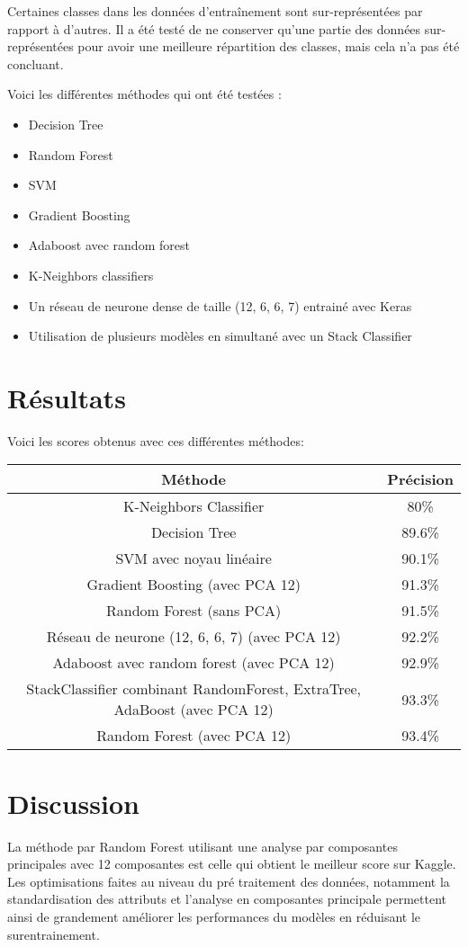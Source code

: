 \documentclass[12pt]{article}
\begin{document}
Certaines classes dans les données d'entraînement sont sur-représentées par rapport à d'autres. Il a été testé de ne conserver qu'une partie des données sur-représentées pour avoir une meilleure répartition des classes, mais cela n'a pas été concluant. 

\newpage
Voici les différentes méthodes qui ont été testées :

\begin{itemize}
	\item Decision Tree
	\item Random Forest
	\item SVM
	\item Gradient Boosting
	\item Adaboost avec random forest
	\item K-Neighbors classifiers
	\item Un réseau de neurone dense de taille (12, 6, 6, 7) entrainé avec Keras
	\item Utilisation de plusieurs modèles en simultané avec un Stack Classifier
	
\end{itemize}


\section*{Résultats}

Voici les scores obtenus avec ces différentes méthodes:
\begin{center}
	\begin{tabular}{ |c|c| }
		\hline
		Méthode & Précision \\\hline\hline
	  K-Neighbors Classifier & 80\% \\\hline
		Decision Tree & 89.6\% \\\hline
		SVM avec noyau linéaire & 90.1\% \\\hline
		Gradient Boosting (avec PCA 12) & 91.3\% \\\hline
		Random Forest (sans PCA) & 91.5\% \\\hline
		Réseau de neurone (12, 6, 6, 7) (avec PCA 12) & 92.2\% \\\hline
		Adaboost avec random forest (avec PCA 12) & 92.9\% \\\hline
		StackClassifier combinant RandomForest, ExtraTree, AdaBoost (avec PCA 12) & 93.3\% \\\hline
		Random Forest (avec PCA 12) & 93.4\% \\\hline

	\end{tabular} 
\end{center}


\section*{Discussion}

La méthode par Random Forest utilisant une analyse par composantes principales avec 12 composantes est celle qui obtient le meilleur score sur Kaggle. Les optimisations faites au niveau du pré traitement des données, notamment la standardisation des attributs et l'analyse en composantes principale permettent ainsi de grandement améliorer les performances du modèles en réduisant le surentrainement.
\end{document}
